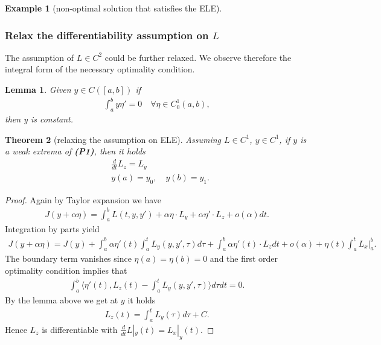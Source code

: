\documentclass[a4paper,11pt,fleqn]{book}
\newtheorem{theorem}{Theorem}[section]
\newtheorem{lemma}[theorem]{Lemma}
\theoremstyle{definition}
\newtheorem*{example}{Example}
\theoremstyle{remark}
\begin{document}
\begin{example}[non-optimal solution that satisfies the ELE]
\end{example}


\subsubsection{Relax the differentiability assumption on $L$}
The assumption of $L \in C^2$ could be further relaxed. We observe therefore the integral form of the necessary optimality condition.

\begin{lemma}
	Given $y \in C([a, b])$ if 
	\begin{align*}
		\int_a^b y \eta' = 0 \quad \forall \eta \in C_0^1(a, b),
	\end{align*}
	then y is constant.
\end{lemma}

\begin{theorem}[relaxing the assumption on ELE]
	Assuming $L \in C^1$, $y \in C^1$, if $y$ is a weak extrema of \textbf{(P1)}, then it holds
	\begin{align*}
		& \frac{d}{dt}L_z = L_y\\
		& y(a) = y_0, \quad y(b) = y_1. 
	\end{align*}
\end{theorem}
\begin{proof}
	Again by Taylor expansion we have
	\begin{align*}
		J(y + \alpha \eta) = \int_a^b L(t, y, y') + \alpha \eta \cdot L_y + \alpha \eta' \cdot L_z + o(\alpha) dt. 
	\end{align*}
	Integration by parts yield
	\begin{align*}
		J(y + \alpha\eta) = J(y) + \int_a^b \alpha \eta'(t) \int_a^t L_y(y, y', \tau) d\tau  + \int_a^b \alpha \eta'(t) \cdot L_z dt + o(\alpha) + \eta(t) \int_a^t L_x\bigg|_a^b.
	\end{align*}
	The boundary term vanishes since $\eta(a) = \eta(b) = 0$ and the first order optimality condition implies that 
	\begin{align*}
		 \int_a^b \langle \eta'(t),  L_z(t)  - \int_a^t L_y(y, y', \tau) \rangle   d\tau dt = 0.
	\end{align*}
	By the lemma above we get at $y$ it holds
	\begin{align*}
		L_z(t) = \int_a^t L_y(\tau) d\tau + C. 
	\end{align*}
	Hence $L_z$ is differentiable with $\frac{d}{dt}L|_y(t) = L_x|_y(t)$. 
\end{proof}
\end{document}

